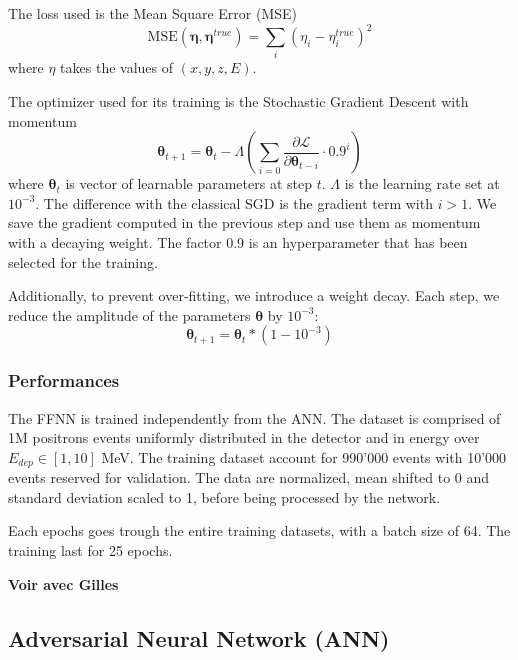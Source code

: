 \documentclass[../main.tex]{subfiles}
\begin{document}
The loss used is the Mean Square Error (MSE)
\begin{equation}
  \text{MSE}(\bm{\eta}, \bm{\eta}^{true}) = \sum_i (\eta_i - \eta_i^{true})^2
\end{equation}
where $\eta$ takes the values of $(x, y, z, E)$.

The optimizer used for its training is the Stochastic Gradient Descent with momentum
\begin{equation}
  \bm{\theta}_{t+1} = \bm{\theta}_t - \Lambda \left(\sum_{i=0} \frac{\partial \mathcal{L}}{\partial \bm{\theta}_{t - i}} \cdot 0.9^{i} \right)
\end{equation}
where $\bm{\theta}_t$ is vector of learnable parameters at step $t$. $\Lambda$ is the learning rate set at  $10^{-3}$. The difference with the classical SGD is the gradient term with $i > 1$. We save the gradient computed in the previous step and use them as momentum with a decaying weight. The factor 0.9 is an hyperparameter that has been selected for the training.

Additionally, to prevent over-fitting, we introduce a weight decay. Each step, we reduce the amplitude of the parameters $\bm{\theta}$ by $10^{-3}$:
\begin{equation}
  \bm{\theta}_{t+1} = \bm{\theta}_t * (1 - 10^{-3})
\end{equation}

\subsubsection{Performances}

The FFNN is trained independently from the ANN. The dataset is comprised of 1M positrons events uniformly distributed in the detector and in energy over $E_{dep} \in [1, 10]$ MeV. The training dataset account for 990'000 events with 10'000 events reserved for validation. The data are normalized, mean shifted to 0 and standard deviation scaled to 1, before being processed by the network.

Each epochs goes trough the entire training datasets, with a batch size of 64. The training last for 25 epochs.

\textbf{Voir avec Gilles}

\subsection{Adversarial Neural Network (ANN)}
\label{sec:janne:arch:ann}
\end{document}
